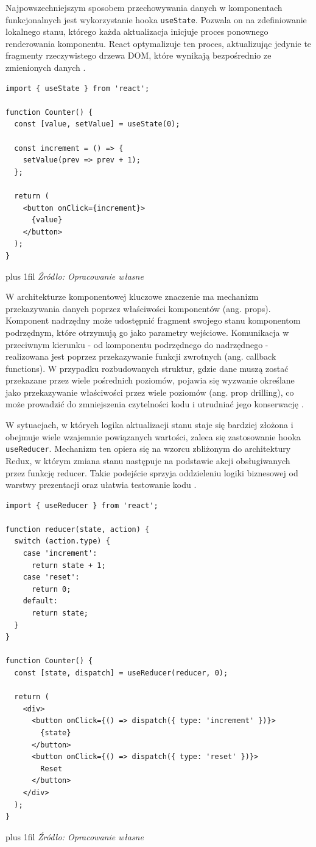 \documentclass[12pt,openright,twoside]{report}
\newcommand{\source}[1]{{\par\vspace{5pt}\noindent\leftskip=0pt \rightskip=0pt \parfillskip=0pt plus 1fil \footnotesize\textit{Źródło: #1}\par}}
\begin{document}
Najpowszechniejszym sposobem przechowywania danych w komponentach funkcjonalnych jest wykorzystanie hooka \texttt{useState}. Pozwala on na zdefiniowanie lokalnego stanu, którego każda aktualizacja inicjuje proces ponownego renderowania komponentu. React optymalizuje ten proces, aktualizując jedynie te fragmenty rzeczywistego drzewa DOM, które wynikają bezpośrednio ze zmienionych danych \cite{React_Hooks_Intro}.

\begin{lstlisting}[language=tsx, caption={Przykład lokalnego zarządzania stanem przy użyciu hooka \texttt{useState}.}, label={lst:react-usestate}]
import { useState } from 'react';

function Counter() {
  const [value, setValue] = useState(0);

  const increment = () => {
    setValue(prev => prev + 1);
  };

  return (
    <button onClick={increment}>
      {value}
    </button>
  );
}
\end{lstlisting}
\source{Opracowanie własne}

W architekturze komponentowej kluczowe znaczenie ma mechanizm przekazywania danych poprzez właściwości komponentów (ang. props). Komponent nadrzędny może udostępnić fragment swojego stanu komponentom podrzędnym, które otrzymują go jako parametry wejściowe. Komunikacja w przeciwnym kierunku - od komponentu podrzędnego do nadrzędnego - realizowana jest poprzez przekazywanie funkcji zwrotnych (ang. callback functions). W przypadku rozbudowanych struktur, gdzie dane muszą zostać przekazane przez wiele pośrednich poziomów, pojawia się wyzwanie określane jako przekazywanie właściwości przez wiele poziomów (ang. prop drilling), co może prowadzić do zmniejszenia czytelności kodu i utrudniać jego konserwację \cite{Learn_React_Design}.

W sytuacjach, w których logika aktualizacji stanu staje się bardziej złożona i obejmuje wiele wzajemnie powiązanych wartości, zaleca się zastosowanie hooka \texttt{useReducer}. Mechanizm ten opiera się na wzorcu zbliżonym do architektury Redux, w którym zmiana stanu następuje na podstawie akcji obsługiwanych przez funkcję reducer. Takie podejście sprzyja oddzieleniu logiki biznesowej od warstwy prezentacji oraz ułatwia testowanie kodu \cite{Learning_React_Third}.

\begin{lstlisting}[language=tsx, caption={Użycie hooka \texttt{useReducer} do obsługi złożonej logiki aktualizacji stanu.}, label={lst:react-usereducer}]
import { useReducer } from 'react';

function reducer(state, action) {
  switch (action.type) {
    case 'increment':
      return state + 1;
    case 'reset':
      return 0;
    default:
      return state;
  }
}

function Counter() {
  const [state, dispatch] = useReducer(reducer, 0);

  return (
    <div>
      <button onClick={() => dispatch({ type: 'increment' })}>
        {state}
      </button>
      <button onClick={() => dispatch({ type: 'reset' })}>
        Reset
      </button>
    </div>
  );
}
\end{lstlisting}
\source{Opracowanie własne}
\end{document}
